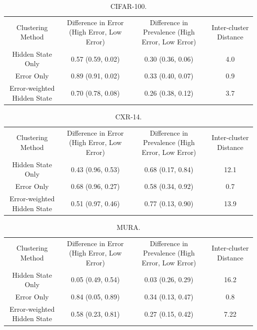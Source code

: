 \documentclass{article}
\begin{document}
 \begin{table}[]
 \centering
\begin{tabular}{cccc}
 Clustering Method & Difference in Error (High Error, Low Error) & Difference in Prevalence (High Error, Low Error) & Inter-cluster Distance \\
 Hidden State Only & 0.57 (0.59, 0.02) & 0.30 (0.36, 0.06) & 4.0 \\
 Error Only & 0.89 (0.91, 0.02) & 0.33 (0.40, 0.07) & 0.9 \\
 Error-weighted Hidden State & 0.70 (0.78, 0.08) & 0.26 (0.38, 0.12) & 3.7
\end{tabular}
\label{tab:clustercifar-1}
\caption{ CIFAR-100.}
\end{table}

 \begin{table}[]
 \centering
\begin{tabular}{cccc}
 Clustering Method & Difference in Error (High Error, Low Error) & Difference in Prevalence (High Error, Low Error) & Inter-cluster Distance \\
 Hidden State Only & 0.43 (0.96, 0.53) & 0.68 (0.17, 0.84) & 12.1 \\
 Error Only & 0.68 (0.96, 0.27) & 0.58 (0.34, 0.92) & 0.7 \\
 Error-weighted Hidden State & 0.51 (0.97, 0.46) & 0.77 (0.13, 0.90) & 13.9
\end{tabular}
\label{tab:clustercxr14-1}
\caption{CXR-14.}
\end{table}

 \begin{table}[]
 \centering
\begin{tabular}{cccc}
 Clustering Method & Difference in Error (High Error, Low Error) & Difference in Prevalence (High Error, Low Error) & Inter-cluster Distance \\
 Hidden State Only & 0.05 (0.49, 0.54) & 0.03 (0.26, 0.29) & 16.2 \\
 Error Only & 0.84 (0.05, 0.89) & 0.34 (0.13, 0.47) & 0.8 \\
 Error-weighted Hidden State & 0.58 (0.23, 0.81) & 0.27 (0.15, 0.42) & 7.22
\end{tabular}
\label{tab:clustermura-1}
\caption{ MURA.}
\end{table}
\end{document}
